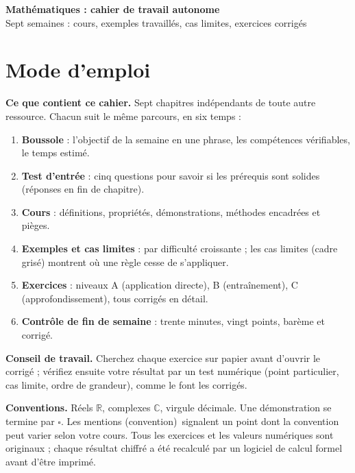 \documentclass[10.5pt,a4paper]{article}
\newcounter{exemple}[section]\newcounter{exo}[section]
\newcommand{\R}{\mathbb{R}}\newcommand{\C}{\mathbb{C}}\newcommand{\N}{\mathbb{N}}
\newcommand{\verif}{\textsf{\textcolor{ardoise}{(convention)}}}
\begin{document}
\begin{center}
 {\LARGE\bfseries\textcolor{marine}{Mathématiques : cahier de travail autonome}}\\[3pt]
 {\large\textcolor{ardoise}{Sept semaines : cours, exemples travaillés, cas limites, exercices corrigés}}
\end{center}

\section*{Mode d'emploi}
\begin{boussole}
\textbf{Ce que contient ce cahier.} Sept chapitres indépendants de toute autre ressource. Chacun suit le même parcours, en six temps :
\begin{enumerate}
 \item \textbf{Boussole} : l'objectif de la semaine en une phrase, les compétences vérifiables, le temps estimé.
 \item \textbf{Test d'entrée} : cinq questions pour savoir si les prérequis sont solides (réponses en fin de chapitre).
 \item \textbf{Cours} : définitions, propriétés, démonstrations, méthodes encadrées et pièges.
 \item \textbf{Exemples et cas limites} : par difficulté croissante ; les cas limites (cadre grisé) montrent où une règle cesse de s'appliquer.
 \item \textbf{Exercices} : niveaux A (application directe), B (entraînement), C (approfondissement), tous corrigés en détail.
 \item \textbf{Contrôle de fin de semaine} : trente minutes, vingt points, barème et corrigé.
\end{enumerate}
\textbf{Conseil de travail.} Cherchez chaque exercice sur papier avant d'ouvrir le corrigé ; vérifiez ensuite votre résultat par un test numérique (point particulier, cas limite, ordre de grandeur), comme le font les corrigés.
\end{boussole}
\textbf{Conventions.} Réels $\R$, complexes $\C$, virgule décimale. Une démonstration se termine par $\square$. Les mentions \verif\ signalent un point dont la convention peut varier selon votre cours. Tous les exercices et les valeurs numériques sont originaux ; chaque résultat chiffré a été recalculé par un logiciel de calcul formel avant d'être imprimé.

\renewcommand{\contentsname}{Sommaire}\tableofcontents


\end{document}
